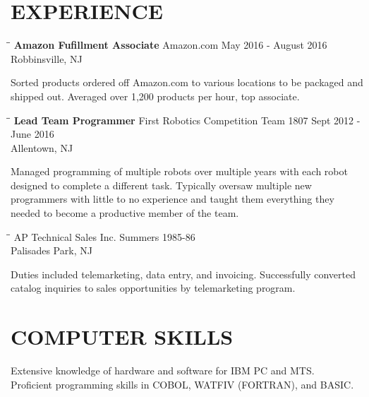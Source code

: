 \documentclass{res}
\begin{document}
\begin{resume}
\section{EXPERIENCE}
   \vspace{-0.1in}	
   \begin{tabbing}
   \hspace{2.3in}\= \hspace{2.6in}\= \kill %
    {\bf Amazon Fufillment Associate} \>Amazon.com    \>May 2016 - August 2016\\
                             \>Robbinsville, NJ
   \end{tabbing}\vspace{-20pt}      %
    Sorted products ordered off Amazon.com to various locations to be packaged and shipped out. Averaged over 1,200 products per hour, top associate.
   \begin{tabbing}
   \hspace{2.3in}\= \hspace{2.6in}\= \kill %
    {\bf Lead Team Programmer} \>First Robotics Competition Team 1807 \>  Sept 2012 - June 2016 \\
                          \>Allentown, NJ
   \end{tabbing}\vspace{-20pt}
    Managed programming of multiple robots over multiple years with each robot designed to complete a different task. Typically oversaw multiple new programmers with little to no experience
     and taught  them everything they needed to become a productive member of the team.  \begin{tabbing}%
   \hspace{2.3in}\= \hspace{2.6in}\= \kill %
   {\bf }  \>AP Technical Sales Inc. \> Summers  1985-86\\
                          \>Palisades Park, NJ
   \end{tabbing}\vspace{-20pt}
    Duties included telemarketing, data entry, and invoicing.          
    Successfully converted catalog inquiries to sales          
    opportunities by telemarketing program.          


\section{COMPUTER SKILLS}          
    Extensive knowledge of hardware and software for IBM PC and          
    MTS. \\         
    Proficient programming skills in COBOL, WATFIV (FORTRAN), and          
    BASIC.          
 

\end{resume}
\end{document}
